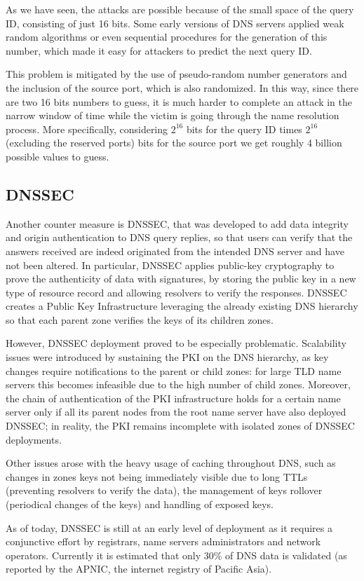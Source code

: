 \documentclass[11pt,a4paper]{article}
\begin{document}
\noindent
As we have seen, the attacks are possible because of the small space of the query ID,
consisting of just 16 bits. Some early versions of DNS servers applied weak random algorithms
or even sequential procedures for the generation of this number, which made it easy for
attackers to predict the next query ID.

\noindent
This problem is mitigated by the use of pseudo-random number generators and the inclusion
of the source port, which is also randomized. In this way, since there are two 16 bits numbers
to guess, it is much harder to complete an attack in the narrow window of time while the victim
is going through the name resolution process. More specifically, considering $2^{16}$ bits for
the query ID times $2^{16}$ (excluding the reserved ports) bits for the source port we get
roughly 4 billion possible values to guess.

\subsection{DNSSEC}

Another counter measure is DNSSEC, that was developed to add data integrity and origin
authentication to DNS query replies, so that users can verify that the answers received
are indeed originated from the intended DNS server and have not been altered. In particular,
DNSSEC applies public-key cryptography to prove the authenticity of data with signatures,
by storing the public key in a new type of resource record and allowing resolvers to verify
the responses. DNSSEC creates a Public Key Infrastructure leveraging the already existing
DNS hierarchy so that each parent zone verifies the keys of its children zones.

\hfill \break
\noindent
However, DNSSEC deployment proved to be especially problematic. Scalability issues were
introduced by sustaining the PKI on the DNS hierarchy, as key changes require notifications
to the parent or child zones: for large TLD name servers this becomes infeasible due to the
high number of child zones. Moreover, the chain of authentication of the PKI infrastructure
holds for a certain name server only if all its parent nodes from the root name server have
also deployed DNSSEC; in reality, the PKI remains incomplete with isolated zones of DNSSEC
deployments.

\noindent
Other issues arose with the heavy usage of caching throughout DNS, such as changes in zones
keys not being immediately visible due to long TTLs (preventing resolvers to verify the data),
the management of keys rollover (periodical changes of the keys) and handling of exposed keys.

\hfill \break
\noindent
As of today, DNSSEC is still at an early level of deployment as it requires a conjunctive
effort by registrars, name servers administrators and network operators. Currently it is
estimated that only 30\% of DNS data is validated (as reported by the APNIC, the internet
registry of Pacific Asia).
\end{document}
